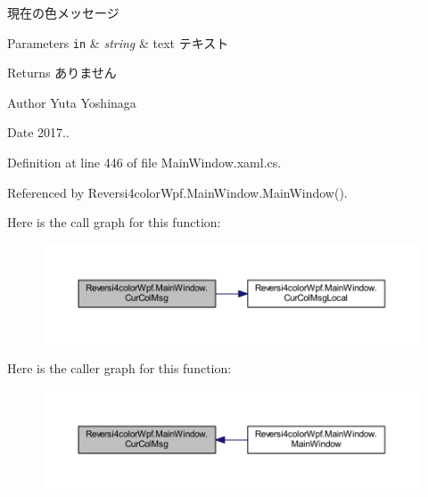 現在の色メッセージ 


\begin{DoxyParams}[1]{Parameters}
\mbox{\tt in}  & {\em string} & text テキスト \\
\hline
\end{DoxyParams}
\begin{DoxyReturn}{Returns}
ありません 
\end{DoxyReturn}
\begin{DoxyAuthor}{Author}
Yuta Yoshinaga 
\end{DoxyAuthor}
\begin{DoxyDate}{Date}
2017.. 
\end{DoxyDate}


Definition at line 446 of file Main\+Window.\+xaml.\+cs.



Referenced by Reversi4color\+Wpf.\+Main\+Window.\+Main\+Window().



Here is the call graph for this function\+:
\nopagebreak
\begin{figure}[H]
\begin{center}
\leavevmode
\includegraphics[width=350pt]{class_reversi4color_wpf_1_1_main_window_ab2c7405df589c397f20edfd497f8b055_cgraph}
\end{center}
\end{figure}




Here is the caller graph for this function\+:
\nopagebreak
\begin{figure}[H]
\begin{center}
\leavevmode
\includegraphics[width=350pt]{class_reversi4color_wpf_1_1_main_window_ab2c7405df589c397f20edfd497f8b055_icgraph}
\end{center}
\end{figure}


